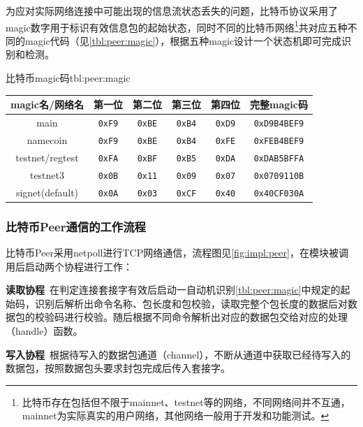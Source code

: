 \documentclass[supercite]{HustGraduPaper}
\newcommand{\rfig}[1]{\autoref{fig:#1}}
\newcommand{\rtbl}[1]{\autoref{tbl:#1}}
\theoremstyle{definition}
\begin{document}
为应对实际网络连接中可能出现的信息流状态丢失的问题，比特币协议采用了magic数字用于标识有效信息包的起始状态，同时不同的比特币网络\footnote{比特币存在包括但不限于mainnet、testnet等的网络，不同网络间并不互通，mainnet为实际真实的用户网络，其他网络一般用于开发和功能测试。}共对应五种不同的magic代码（见\rtbl{peer:magic}），根据五种magic设计一个状态机即可完成识别和检测。
\begin{generaltab}{比特币magic码}{tbl:peer:magic}
  \begin{tabular}{c|ccccc}
    \toprule
    magic名/网络名    & 第一位 & 第二位 & 第三位 & 第四位 & 完整magic码\\
    \midrule
    main             & \texttt{0xF9} & \texttt{0xBE} & \texttt{0xB4} & \texttt{0xD9} & \texttt{0xD9B4BEF9}\\
    namecoin         & \texttt{0xF9} & \texttt{0xBE} & \texttt{0xB4} & \texttt{0xFE} & \texttt{0xFEB4BEF9}\\
    testnet/regtest  & \texttt{0xFA} & \texttt{0xBF} & \texttt{0xB5} & \texttt{0xDA} & \texttt{0xDAB5BFFA}\\
    testnet3         & \texttt{0x0B} & \texttt{0x11} & \texttt{0x09} & \texttt{0x07} & \texttt{0x0709110B}\\
    signet(default)  & \texttt{0x0A} & \texttt{0x03} & \texttt{0xCF} & \texttt{0x40} & \texttt{0x40CF030A}\\
    \bottomrule
  \end{tabular}
\end{generaltab}

\subsubsection{比特币Peer通信的工作流程}
比特币Peer采用netpoll进行TCP网络通信，流程图见\rfig{impl:peer}，在模块被调用后启动两个协程进行工作：



\textbf{读取协程}\ 在判定连接套接字有效后启动一自动机识别\rtbl{peer:magic}中规定的起始码，识别后解析出命令名称、包长度和包校验，读取完整个包长度的数据后对数据包的校验码进行校验。随后根据不同命令解析出对应的数据包交给对应的处理（handle）函数。

\textbf{写入协程}\ 根据待写入的数据包通道（channel），不断从通道中获取已经待写入的数据包，按照数据包头要求封包完成后传入套接字。
\end{document}
